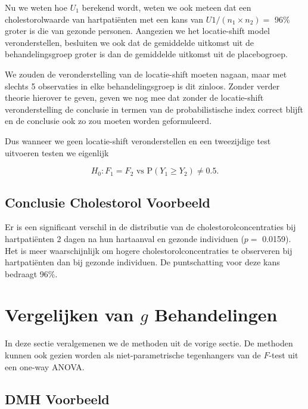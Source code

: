 \documentclass[
  12pt,dutch,coursenotes]{book}
\begin{document}
Nu we weten hoe \(U_1\) berekend wordt, weten we ook meteen dat een cholestorolwaarde van hartpatiënten met een kans van
\(U1/(n_1\times n_2)=\) 96\%
groter is die van gezonde personen. Aangezien we het locatie-shift model veronderstellen, besluiten we ook dat de gemiddelde uitkomst uit de behandelingsgroep groter is dan de gemiddelde uitkomst uit de placebogroep.

We zouden de veronderstelling van de locatie-shift moeten nagaan, maar met slechts 5 observaties in elke behandelingsgroep is dit zinloos. Zonder verder theorie hierover te geven, geven we nog mee dat zonder de locatie-shift veronderstelling de conclusie in termen van de probabilistische index correct blijft en de conclusie ook zo zou moeten worden geformuleerd.

Dus wanneer we geen locatie-shift veronderstellen en een tweezijdige test uitvoeren testen we eigenlijk

\[H_0: F_1=F_2 \text{ vs P}(Y_1 \geq Y_2) \neq 0.5.\]

\hypertarget{conclusie-cholestorol-voorbeeld}{%
\subsection{Conclusie Cholestorol Voorbeeld}\label{conclusie-cholestorol-voorbeeld}}

Er is een significant verschil in de distributie van de cholestorolconcentraties bij hartpatiënten 2 dagen na hun hartaanval en gezonde individuen (\(p=\) 0.0159). Het is meer waarschijnlijk om hogere cholestorolconcentraties te observeren bij hartpatiënten dan bij gezonde individuen. De puntschatting voor deze kans bedraagt 96\%.

\hypertarget{vergelijken-van-g-behandelingen}{%
\section{\texorpdfstring{Vergelijken van \(g\) Behandelingen}{Vergelijken van g Behandelingen}}\label{vergelijken-van-g-behandelingen}}

In deze sectie veralgemenen we de methoden uit de vorige sectie.
De methoden kunnen ook gezien worden
als niet-parametrische tegenhangers van de \(F\)-test uit een one-way ANOVA.

\hypertarget{dmh-voorbeeld}{%
\subsection{DMH Voorbeeld}\label{dmh-voorbeeld}}
\end{document}
